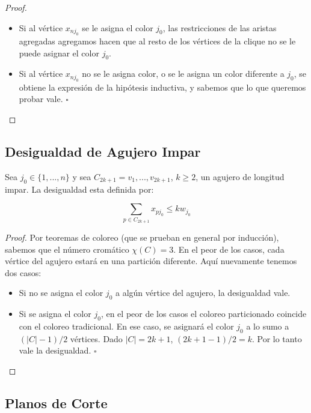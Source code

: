 \begin{proof}
\begin{itemize}
\item Si al vértice $x_{nj_0}$ se le asigna el color $j_0$, las restricciones de las aristas agregadas agregamos hacen que al resto de los vértices de la clique no se le puede asignar el color $j_0$.
\item Si al vértice $x_{nj_0}$ no se le asigna color, o se le asigna un color diferente a $j_0$, se obtiene la expresión de la hipótesis inductiva, y sabemos que lo que queremos probar vale. \hfill $\square$
\end{itemize}
\end{proof}

\subsection{Desigualdad de Agujero Impar}

Sea $j_0 \in \{1,...,n\}$ y sea $C_{2k+1} = v_1,...,v_{2k+1}$, $k \geq 2$, un agujero de longitud impar. La desigualdad esta definida por:

\begin{equation}
\sum_{p \in C_{2k+1}} x_{pj_0} \leq k w_{j_0}
\end{equation}

\begin{proof}
Por teoremas de coloreo (que se prueban en general por inducción), sabemos que el número cromático $\chi(C) = 3$. En el peor de los casos, cada vértice del agujero estará en una partición diferente. Aquí nuevamente tenemos dos casos:

\begin{itemize}
\item Si no se asigna el color $j_0$ a algún vértice del agujero, la desigualdad vale.
\item Si se asigna el color $j_0$, en el peor de los casos el coloreo particionado coincide con el coloreo tradicional. En ese caso, se asignará el color $j_0$ a lo sumo a $(|C|-1)/2$ vértices. Dado $|C| = 2k+1$,  $(2k+1-1)/2 = k$. Por lo tanto vale la desigualdad.  \hfill $\square$
\end{itemize}

\end{proof}

\subsection{Planos de Corte}

